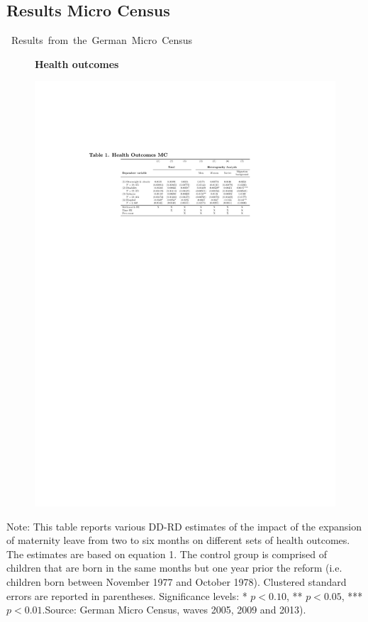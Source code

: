 \documentclass[aspectratio=169,handout]{beamer} %
\begin{document}
\subsection*{Results Micro Census}
\label{MZ}
\begin{frame}{\mbox{ Results from the German Micro Census}}
\begin{figure} \begin{center}
\textbf{Health outcomes}
\end{center} 
\includegraphics[width = 0.99\linewidth]{../../analysis/graphs/KKH/outcome_MZ_health.pdf}
\end{figure}\vspace{-2.5em}
\tiny \flushleft Note: This table reports various DD-RD estimates of the impact of the expansion of maternity leave from two to six months on different sets of health outcomes. The estimates are based on equation 1. The control group is comprised of children that are born in the same months but one year prior the reform (i.e. children born between  November 1977 and October 1978). Clustered standard errors are reported in parentheses. Significance levels: * \(p<0.10\), ** \(p<0.05\), *** \(p<0.01\).\newline Source: German Micro Census, waves 2005, 2009 and 2013). 
\hyperlink{BACK_FROM_MZ}{}
\end{frame}
\end{document}
